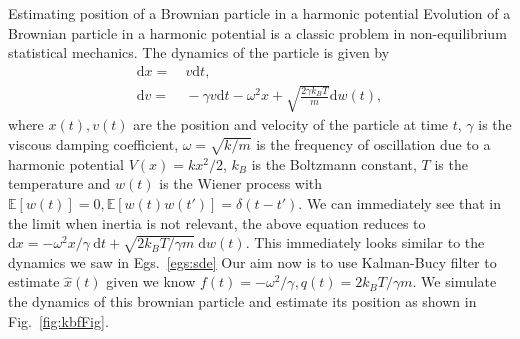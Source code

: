 \documentclass{resonance}
\def\d{\text{d}}
\def\E{\mathbb{E}}
\def\E{\mathbb{E}}
\begin{document}
\begin{egsBox}[label={egs:kbf}]{Estimating position of a Brownian particle in a harmonic potential}
\footnotesize
Evolution of a Brownian particle in a harmonic potential is a classic problem in non-equilibrium statistical mechanics. The dynamics of the particle is given by
\begin{align*}
    \d x =& \ v \d t, \\
    \d v =& \ - \gamma v \d t - \omega^2 x + \sqrt{\frac{2\gamma k_B T}{m}} \d w(t),
\end{align*}
where $x(t), v(t)$ are the position and velocity of the particle at time $t$, $\gamma$ is the viscous damping coefficient, $\omega = \sqrt{k/m}$ is the frequency of oscillation due to a harmonic potential $V(x) = k x^2/2$, $k_B$ is the Boltzmann constant, $T$ is the temperature and $w(t)$ is the Wiener process with $\E[w(t)]=0, \E[w(t)w(t')]=\delta(t-t')$. We can immediately see that in the limit when inertia is not relevant, the above equation reduces to $\d x = - \omega^2 x/\gamma \ \d t + \sqrt{2k_B T/\gamma m} \ \d w(t)$. This immediately looks similar to the dynamics we saw in Egs.~\ref{egs:sde} Our aim now is to use Kalman-Bucy filter to estimate $\hat{x}(t)$ given we know $f(t) = -\omega^2/\gamma, q(t) = 2k_B T/\gamma m$. We simulate the dynamics of this brownian particle and estimate its position as shown in Fig.~\ref{fig:kbfFig}.
\end{egsBox}
\end{document}
